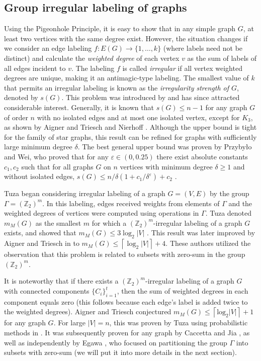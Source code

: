 \documentclass{article}
\newcommand{\zet}{\mathbb{Z}}
\begin{document}
\subsection{Group irregular labeling of graphs}
Using the Pigeonhole Principle, it is easy to show that in any simple graph $G$, at least two vertices with the same degree exist. However, the situation changes if we consider an edge labeling $f:E(G)\rightarrow \{1, \ldots, k\}$ (where labels need not be distinct) and calculate the \textit{weighted degree} of each vertex $v$ as the sum of labels of all edges incident to $v$. The labeling 
$f$ is called \textit{irregular} if all vertex weighted degrees are unique, making it an antimagic-type labeling. The smallest value of $k$ that permits an irregular labeling is known as the \textit{irregularity strength of 
$G$}, denoted by $s(G)$. This problem was introduced by \cite{ref_ChaJacLehOelRuiSab1} and has since attracted considerable interest. Generally, it is known that $s(G) \leq n -1$ for any graph $G$ of order 
$n$ with no isolated edges and at most one isolated vertex, except for $K_3$, as shown by Aigner and Triesch \cite{AigTrie} and Nierhoff \cite{TigBouIrrStr}. Although the upper bound is tight for the family of star graphs, this result can be refined for graphs with sufficiently large minimum degree $\delta$. The best general upper bound was proven by Przybyło and Wei, who proved that for any $\varepsilon \in  (0, 0.25)$
there exist absolute constants $c_1, c_2$ such that for all graphs $G$ on $n$ vertices with minimum degree
$\delta\geq 1$ and without isolated edges, $s(G) \leq  n/\delta(1 + c_1/\delta^{\varepsilon}) + c_2$ \cite{PrzWei}.


Tuza began considering irregular labeling of a graph 
$G=(V,E)$ by the group $\Gamma=(\zet_2)^m$. In this labeling, edges received weights from elements of 
$\Gamma$ and the weighted degrees of vertices were computed using operations in $\Gamma$. Tuza denoted 
$m_M(G)$ as the smallest $m$ for which a $(\zet_2)^m$-irregular labeling of a graph $G$ exists, and showed that $m_M(G)\leq 3\log_2|V|$ \cite{Tuza}. This result was later improved by Aigner and Triesch in \cite{ref_AigTri94} to $m_M(G)\leq \left\lceil \log_2|V|\right\rceil+4$. These authors utilized the observation that this problem is related to subsets with zero-sum in the group $(\zet_2)^m$.

It is noteworthy that if there exists a $(\zet_2)^m$-irregular labeling of a graph $G$ with connected components $\{C_i\}_{i=1}^t$, then the sum of weighted degrees in each component equals zero (this follows because each edge's label is added twice to the weighted degrees). Aigner and Triesch conjectured $m_M(G)\leq \left\lceil \text{log}_2|V|\right\rceil+1$ for any graph $G$.  For large $|V|=n$, this was proven by Tuza using probabilistic methods in \cite{Tuza2}. It was subsequently proven for any graph by Caccetta and Jia \cite{CaccJia}, as well as independently by Egawa \cite{Egawa}, who focused on partitioning the group $\Gamma$ into subsets with zero-sum (we will put it into more details in the next section).
\end{document}
